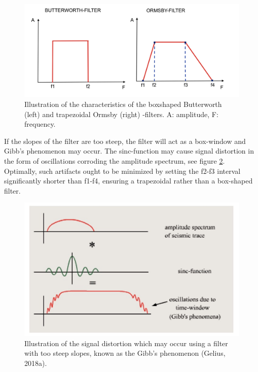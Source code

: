 \documentclass[10pt,a4paper]{article}
\begin{document}
\begin{figure}[H]
\includegraphics[scale=0.1]{fig9.jpg}
\caption{Illustration of the characteristics of the boxshaped Butterworth (left) and trapezoidal Ormsby (right) -filters. A: amplitude, F: frequency.}
\label{fig9}
\end{figure}

\newpage

\noindent If the slopes of the filter are too steep, the filter will act as a box-window and Gibb’s phenomenon may occur. The sinc-function may cause signal distortion in the form of oscillations corroding the amplitude spectrum, see figure \ref{fig10}. Optimally, such artifacts ought to be minimized by setting the f2-f3 interval significantly shorter than f1-f4, ensuring a trapezoidal rather than a box-shaped filter.

\begin{figure}[H]
\centering
\includegraphics[scale=0.4]{fig10.jpg}
\caption{Illustration of the signal distortion which may occur using a filter with too steep slopes, known as the Gibb’s phenomenon (Gelius, 2018a).}
\label{fig10}
\end{figure}
\end{document}
